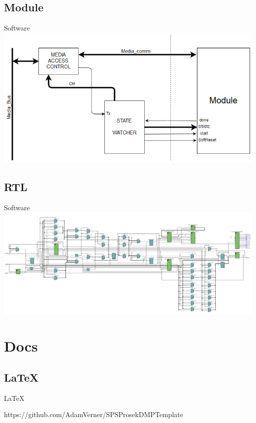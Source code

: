 \documentclass{beamer}
\begin{document}
	\subsection{Module}
		\begin{frame}{Software}
			\includegraphics[width=\linewidth]{module.jpg}
		\end{frame}
	\subsection{RTL}	
		\begin{frame}{Software}
			\includegraphics[width=\linewidth]{rtl_fake.png}
		\end{frame}
	
	
\section{Docs}

	\subsection{LaTeX}
		\begin{frame}{LaTeX}
			
		https://github.com/AdamVerner/SPSProsekDMPTemplate
			
		\end{frame}
\end{document}
